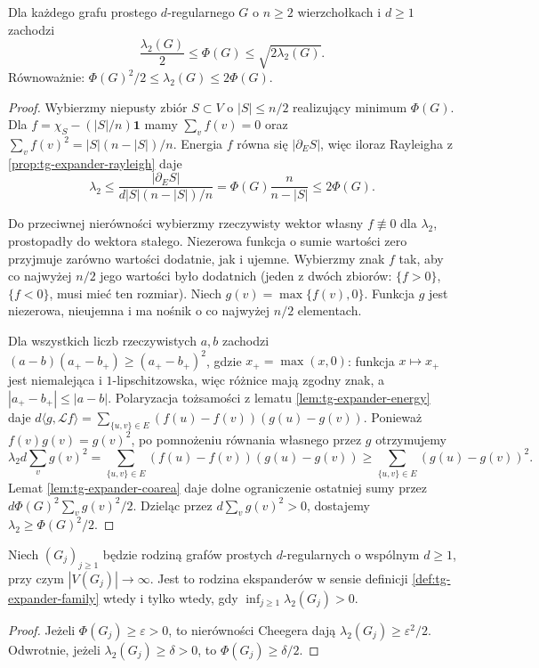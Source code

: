\begin{twierdzenie}
\label{thm:tg-expander-cheeger}
Dla każdego grafu prostego
$d$-regularnego $G$
o $n\geq2$ wierzchołkach i $d\geq1$
zachodzi
\[
\frac{\lambda_2(G)}2
\leq\Phi(G)\leq\sqrt{2\lambda_2(G)}.
\]
Równoważnie:
$\Phi(G)^2/2\leq\lambda_2(G)\leq2\Phi(G)$.
\end{twierdzenie}
\begin{proof}
Wybierzmy niepusty zbiór
$S\subset V$ o $|S|\leq n/2$
realizujący minimum $\Phi(G)$.
Dla $f=\chi_S-(|S|/n)\boldsymbol1$
mamy $\sum_vf(v)=0$ oraz
$\sum_vf(v)^2=|S|(n-|S|)/n$.
Energia $f$ równa się
$|\partial_ES|$, więc iloraz
Rayleigha z
\ref{prop:tg-expander-rayleigh} daje
\[
\lambda_2
\leq\frac{|\partial_ES|}
{d|S|(n-|S|)/n}
=\Phi(G)\frac n{n-|S|}
\leq2\Phi(G).
\]

Do przeciwnej nierówności
wybierzmy rzeczywisty
wektor własny $f\not\equiv0$
dla $\lambda_2$, prostopadły
do wektora stałego.
Niezerowa funkcja o sumie wartości zero
przyjmuje zarówno wartości dodatnie, jak i ujemne.
Wybierzmy znak $f$ tak, aby co najwyżej $n/2$
jego wartości było dodatnich
(jeden z dwóch zbiorów:
$\{f>0\}$, $\{f<0\}$,
musi mieć ten rozmiar).
Niech $g(v)=\max\{f(v),0\}$.
Funkcja $g$ jest niezerowa,
nieujemna i ma nośnik
o co najwyżej $n/2$ elementach.

Dla wszystkich liczb rzeczywistych
$a,b$ zachodzi
$(a-b)(a_+-b_+)\geq(a_+-b_+)^2$,
gdzie $x_+=\max(x,0)$: funkcja $x\mapsto x_+$
jest niemalejąca i $1$-lipschitzowska, więc różnice
mają zgodny znak, a $|a_+-b_+|\leq|a-b|$.
Polaryzacja tożsamości z lematu
\ref{lem:tg-expander-energy} daje
$d\langle g,\mathcal Lf\rangle=
\sum_{\{u,v\}\in E}(f(u)-f(v))(g(u)-g(v))$.
Ponieważ $f(v)g(v)=g(v)^2$, po pomnożeniu
równania własnego przez $g$ otrzymujemy
\[
\lambda_2d\sum_vg(v)^2
=\sum_{\{u,v\}\in E}(f(u)-f(v))(g(u)-g(v))
\geq\sum_{\{u,v\}\in E}(g(u)-g(v))^2.
\]
Lemat \ref{lem:tg-expander-coarea}
daje dolne ograniczenie
ostatniej sumy przez
$d\Phi(G)^2\sum_vg(v)^2/2$.
Dzieląc przez
$d\sum_vg(v)^2>0$,
dostajemy
$\lambda_2\geq\Phi(G)^2/2$.
\end{proof}

\begin{wniosek}
\label{cor:tg-expander-spectral-family}
Niech $(G_j)_{j\geq1}$ będzie rodziną
grafów prostych $d$-regularnych o wspólnym
$d\geq1$, przy czym $|V(G_j)|\to\infty$.
Jest to rodzina ekspanderów w sensie
definicji \ref{def:tg-expander-family}
wtedy i tylko wtedy, gdy
$\inf_{j\geq1}\lambda_2(G_j)>0$.
\end{wniosek}
\begin{proof}
Jeżeli $\Phi(G_j)\geq\varepsilon>0$,
to nierówności Cheegera dają
$\lambda_2(G_j)\geq\varepsilon^2/2$.
Odwrotnie, jeżeli
$\lambda_2(G_j)\geq\delta>0$,
to $\Phi(G_j)\geq\delta/2$.
\end{proof}

